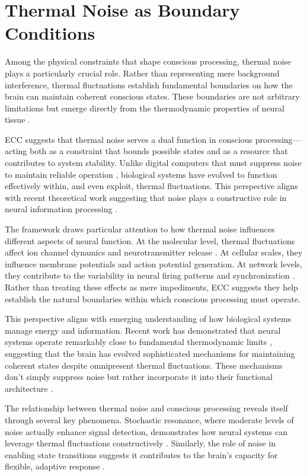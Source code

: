\section{Thermal Noise as Boundary Conditions}

Among the physical constraints that shape conscious processing, thermal noise plays a particularly crucial role. Rather than representing mere background interference, thermal fluctuations establish fundamental boundaries on how the brain can maintain coherent conscious states. These boundaries are not arbitrary limitations but emerge directly from the thermodynamic properties of neural tissue \cite{faisal2008}.

ECC suggests that thermal noise serves a dual function in conscious processing—acting both as a constraint that bounds possible states and as a resource that contributes to system stability. Unlike digital computers that must suppress noise to maintain reliable operation \cite{vanderziel1988}, biological systems have evolved to function effectively within, and even exploit, thermal fluctuations. This perspective aligns with recent theoretical work suggesting that noise plays a constructive role in neural information processing \cite{mcdonnell2011}.

The framework draws particular attention to how thermal noise influences different aspects of neural function. At the molecular level, thermal fluctuations affect ion channel dynamics and neurotransmitter release \cite{attwell2001}. At cellular scales, they influence membrane potentials and action potential generation. At network levels, they contribute to the variability in neural firing patterns and synchronization \cite{schreiber2003}. Rather than treating these effects as mere impediments, ECC suggests they help establish the natural boundaries within which conscious processing must operate.

This perspective aligns with emerging understanding of how biological systems manage energy and information. Recent work has demonstrated that neural systems operate remarkably close to fundamental thermodynamic limits \cite{laughlin2001}, suggesting that the brain has evolved sophisticated mechanisms for maintaining coherent states despite omnipresent thermal fluctuations. These mechanisms don't simply suppress noise but rather incorporate it into their functional architecture \cite{harris2012}.

The relationship between thermal noise and conscious processing reveals itself through several key phenomena. Stochastic resonance, where moderate levels of noise actually enhance signal detection, demonstrates how neural systems can leverage thermal fluctuations constructively \cite{gammaitoni1998}. Similarly, the role of noise in enabling state transitions suggests it contributes to the brain's capacity for flexible, adaptive response \cite{mcdonnell2009}.

